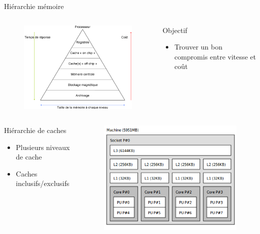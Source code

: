 \begin{frame}{Hiérarchie mémoire}
  \begin{columns}[c]
    \begin{column}{.5\textwidth}
      \begin{figure}[h!]
	\includegraphics[scale=.35]{images/hierarchy.png}
      \end{figure}
    \end{column}
    \begin{column}{.5\textwidth}
      \begin{block}{Objectif}
	\begin{itemize}
	\item{Trouver un bon compromis entre vitesse et coût}
	\end{itemize}
      \end{block}
    \end{column}
  \end{columns}
  \begin{columns}[c]
    \begin{column}{.6\textwidth}
      \begin{block}{Hiérarchie de caches}
	\begin{itemize}
	\item{Plusieurs niveaux de cache}
	\item{Caches inclusifs/exclusifs}
	\end{itemize}
      \end{block}
    \end{column}
    \begin{column}{.4\textwidth}
      \begin{figure}[h!]
	\includegraphics[scale=.3]{images/lstopo.png}

\end{figure}
\end{column}
\end{columns}
\end{frame}
